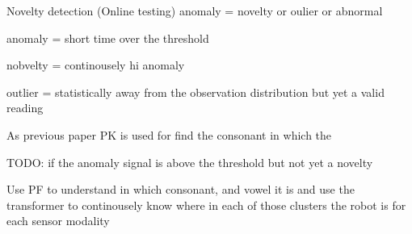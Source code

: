 \begin{frame}{Novelty detection (Online testing)}
    anomaly = novelty or oulier or abnormal
    
    anomaly = short time over the threshold
    
    nobvelty = continousely hi anomaly
    
    outlier = statistically away from the observation distribution but yet a valid reading
    
    As previous paper PK is used for find the consonant in which the
    
    TODO: if the anomaly signal is above the threshold but not yet a novelty
    
    Use PF to understand in which consonant, and vowel it is and use the transformer to continousely know where in each of those clusters the robot is for each sensor modality
\end{frame}
